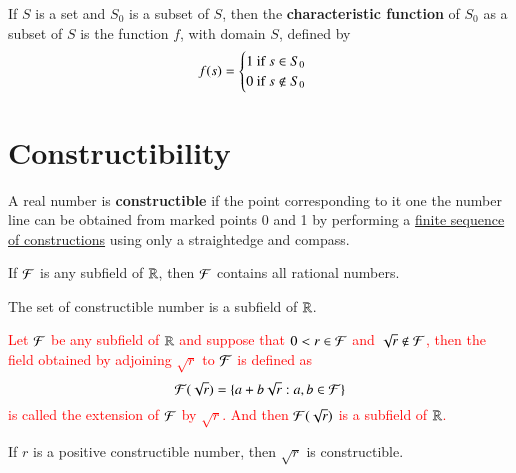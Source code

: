 \documentclass[11pt]{article}
\begin{document}
        \begin{definition}[10.3.31]
            If $S$ is a set and $S_0$ is a subset of $S$, then the \textbf{characteristic function} of $S_0$ as a subset of $S$ is the function $f$, with domain $S$, defined by
            \[
                f(s) = \begin{cases}
                    1 \text{{ if }} s \in S_0 \\
                    0 \text{{ if }} s \notin S_0
                \end{cases}
            \]
        \end{definition}
        	
        	\setcounter{section}{11}
    \section{Constructibility}
        \begin{definition}[12.2.2]
            A real number is \textbf{constructible} if the point corresponding to it one the number line can be obtained from marked points 0 and 1 by performing a \ul{finite sequence of constructions} using only a straightedge and compass.
        \end{definition}
        
        \begin{theorem}[12.2.9]
            If $\mathcal{{F}}$ is any subfield of $\mathbb{R}$, then $\mathcal{{F}}$ contains all rational numbers.
        \end{theorem}
        
        \begin{theorem}[12.2.10]
            The set of constructible number is a subfield of $\mathbb{R}$.
        \end{theorem}
        
        \begin{theorem}[12.2.12\& 12.2.13]
            \textcolor{red}{Let $\mathcal{{F}}$ be any subfield of $\mathbb{R}$ and suppose that $0 < r \in \mathcal{{F}}$ and $\sqrt{r} \notin \mathcal{{F}}$, then the field obtained by adjoining $\sqrt{r}$ to $\mathcal{{F}}$ is defined as 
            \[
                \mathcal{{F}}(\sqrt{r}) = \{a + b \sqrt{r}: a, b \in \mathcal{{F}}\}
            \]
            is called the extension of $\mathcal{{F}}$ by $\sqrt{r}$. And then $\mathcal{{F}}(\sqrt{r})$ is a subfield of $\mathbb{R}$.
            }
        \end{theorem}
        
        \begin{theorem}[12.2.15]
            If $r$ is a positive constructible number, then $\sqrt{r}$ is constructible.
        \end{theorem}
        
\end{document}

